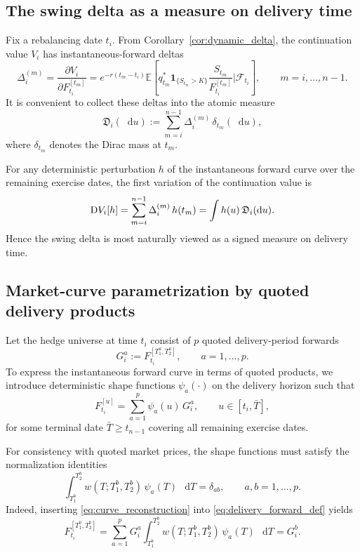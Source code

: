 \documentclass[10pt,a4paper,reqno]{amsart}
\newcommand{\<}{\langle}
\renewcommand{\>}{\rangle}
\theoremstyle{example}
\newcommand*\D{\mathop{}\!\mathrm{d}}
\newcommand*\DD{\mathop{}\!\textnormal{D}}
\begin{document}
\subsection{The swing delta as a measure on delivery time}

Fix a rebalancing date $t_i$. From Corollary~\ref{cor:dynamic_delta}, the continuation value
$V_i$ has instantaneous-forward deltas
\[
\Delta_i^{(m)}
=
\frac{\partial V_i}{\partial F_{t_i}^{[t_m]}}
=
e^{-r(t_m-t_i)}
\mathbb{E}\!\left[
q_{t_m}^*
\mathbf{1}_{\{S_{t_m}>K\}}
\frac{S_{t_m}}{F_{t_i}^{[t_m]}}
\Bigg|
\mathcal{F}_{t_i}
\right],
\qquad m=i,\dots,n-1.
\]
It is convenient to collect these deltas into the atomic measure
\begin{equation}
\label{eq:delta_measure}
\mathfrak{D}_i(\D u)
:=
\sum_{m=i}^{n-1}
\Delta_i^{(m)}\,\delta_{t_m}(\D u),
\end{equation}
where $\delta_{t_m}$ denotes the Dirac mass at $t_m$.

For any deterministic perturbation $h$ of the instantaneous forward curve over the remaining exercise dates,
the first variation of the continuation value is
\begin{equation}
\label{eq:gateaux_delta_measure}
\DD V_i[h]
=
\sum_{m=i}^{n-1}
\Delta_i^{(m)}\,h(t_m)
=
\int h(u)\,\mathfrak{D}_i(\D u).
\end{equation}
Hence the swing delta is most naturally viewed as a signed measure on delivery time.

\subsection{Market-curve parametrization by quoted delivery products}

Let the hedge universe at time $t_i$ consist of $p$ quoted delivery-period forwards
\[
G_i^a := F_{t_i}^{[T_1^a,T_2^a]},
\qquad a=1,\dots,p.
\]
To express the instantaneous forward curve in terms of quoted products, we introduce deterministic
shape functions $\psi_a(\cdot)$ on the delivery horizon such that
\begin{equation}
\label{eq:curve_reconstruction}
F_{t_i}^{[u]}
=
\sum_{a=1}^p \psi_a(u)\,G_i^a,
\qquad u\in[t_i,\bar T],
\end{equation}
for some terminal date $\bar T \ge t_{n-1}$ covering all remaining exercise dates.

For consistency with quoted market prices, the shape functions must satisfy the normalization identities
\begin{equation}
\label{eq:shape_normalization}
\int_{T_1^b}^{T_2^b}
w(T;T_1^b,T_2^b)\,\psi_a(T)\,\D T
=
\delta_{ab},
\qquad a,b=1,\dots,p.
\end{equation}
Indeed, inserting \eqref{eq:curve_reconstruction} into \eqref{eq:delivery_forward_def} yields
\[
F_{t_i}^{[T_1^b,T_2^b]}
=
\sum_{a=1}^p G_i^a
\int_{T_1^b}^{T_2^b}
w(T;T_1^b,T_2^b)\,\psi_a(T)\,\D T
=
G_i^b.
\]
\end{document}
